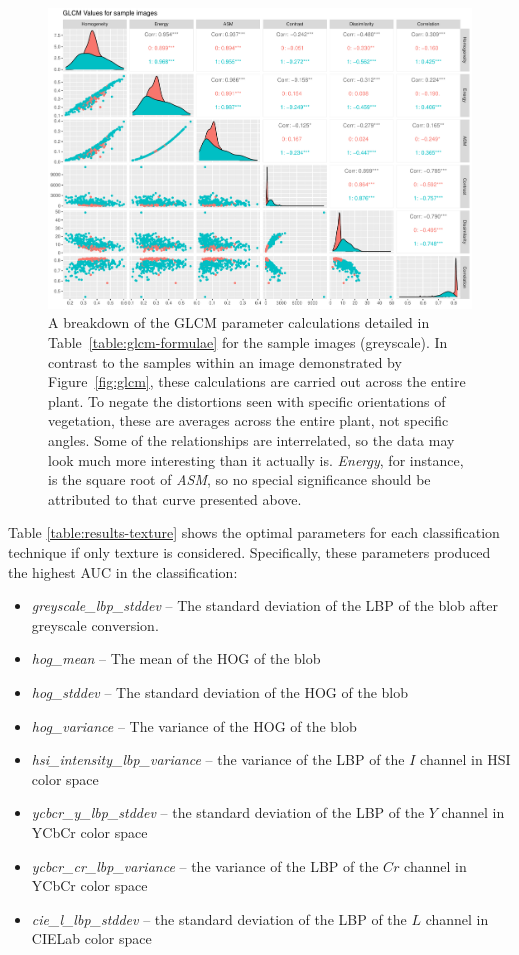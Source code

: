\documentclass[letterpaper]{report}
\begin{document}
\begin{figure}[H]
	\centering
	\includegraphics[width=0.9\linewidth]{./figures/glcm-pairs.pdf}
	\caption[GLCM parameter correlation assessment]{A breakdown of the GLCM parameter calculations detailed in Table~\ref{table:glcm-formulae} for the sample images (greyscale). In contrast to the samples within an image demonstrated by Figure~\ref{fig:glcm}, these calculations are carried out across the entire plant. To negate the distortions seen with specific orientations of vegetation, these are averages across the entire plant, not specific angles. Some of the relationships are interrelated, so the data may look much more interesting than it actually is. \textit{Energy}, for instance, is the square root of \textit{ASM}, so no special significance should be attributed to that curve presented above.}
\end{figure} 

Table \ref{table:results-texture} shows the optimal parameters for each classification technique if only texture is considered. Specifically, these parameters produced the highest AUC in the classification:
\begin{itemize}
	\item{\textit{greyscale\_lbp\_stddev} -- The standard deviation of the LBP of the blob after greyscale conversion.}
	\item{\textit{hog\_mean} -- The mean of the HOG of the blob}
	\item{\textit{hog\_stddev} -- The standard deviation of the HOG of the blob}
	\item{\textit{hog\_variance} -- The variance of the HOG of the blob}
	\item{\textit{hsi\_intensity\_lbp\_variance} -- the variance of the LBP of the $I$ channel in HSI color space}
	\item{\textit{ycbcr\_y\_lbp\_stddev} -- the standard deviation of the LBP of the $Y$ channel in YCbCr color space}
	\item{\textit{ycbcr\_cr\_lbp\_variance} -- the variance of the LBP of the $Cr$ channel in YCbCr color space}	
	\item{\textit{cie\_l\_lbp\_stddev} -- the standard deviation of the LBP of the $L$ channel in CIELab color space}
\end{itemize}
\end{document}

